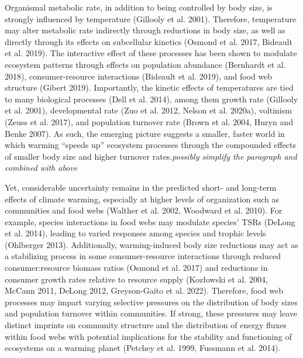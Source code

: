 \documentclass[
]{article}
\begin{document}
Organismal metabolic rate, in addition to being controlled by body size,
is strongly influenced by temperature (Gillooly et al. 2001). Therefore,
temperature may alter metabolic rate indirectly through reductions in
body size, as well as directly through its effects on subcellular
kinetics (Osmond et al. 2017, Bideault et al. 2019). The interactive
effect of these processes has been shown to modulate ecosystem patterns
through effects on population abundance (Bernhardt et al. 2018),
consumer-resource interactions (Bideault et al. 2019), and food web
structure (Gibert 2019). Importantly, the kinetic effects of
temperatures are tied to many biological processes (Dell et al. 2014),
among them growth rate (Gillooly et al. 2001), developmental rate (Zuo
et al. 2012, Nelson et al. 2020a), voltinism (Zeuss et al. 2017), and
population turnover rate (Brown et al. 2004, Huryn and Benke 2007). As
such, the emerging picture suggests a smaller, faster world in which
warming ``speeds up'' ecosystem processes through the compounded effects
of smaller body size and higher turnover rates.\emph{possibly simplify
the paragraph and combined with above}

Yet, considerable uncertainty remains in the predicted short- and
long-term effects of climate warming, especially at higher levels of
organization such as communities and food webs (Walther et al. 2002,
Woodward et al. 2010). For example, species interactions in food webs
may modulate species' TSRs (DeLong et al. 2014), leading to varied
responses among species and trophic levels (Ohlberger 2013).
Additionally, warming-induced body size reductions may act as a
stabilizing process in some consumer-resource interactions through
reduced consumer:resource biomass ratios (Osmond et al. 2017) and
reductions in consumer growth rates relative to resource supply
(Kozłowski et al. 2004, McCann 2011, DeLong 2012, Greyson-Gaito et al.
2022). Therefore, food web processes may impart varying selective
pressures on the distribution of body sizes and population turnover
within communities. If strong, these pressures may leave distinct
imprints on community structure and the distribution of energy fluxes
within food webs with potential implications for the stability and
functioning of ecosystems on a warming planet (Petchey et al. 1999,
Fussmann et al. 2014).
\end{document}
